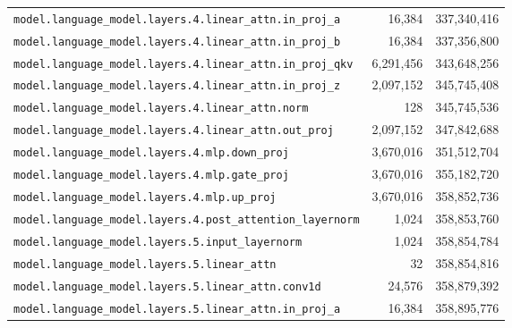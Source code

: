 \documentclass[10pt,a4paper]{article}
\theoremstyle{definition}
\begin{document}
\begin{appendices}
\begin{longtable}{p{9.5cm}rr}
\texttt{model.\allowbreak{}language\_model.\allowbreak{}layers.\allowbreak{}4.\allowbreak{}linear\_attn.\allowbreak{}in\_proj\_a} & 16,384 & 337,340,416 \\
\texttt{model.\allowbreak{}language\_model.\allowbreak{}layers.\allowbreak{}4.\allowbreak{}linear\_attn.\allowbreak{}in\_proj\_b} & 16,384 & 337,356,800 \\
\texttt{model.\allowbreak{}language\_model.\allowbreak{}layers.\allowbreak{}4.\allowbreak{}linear\_attn.\allowbreak{}in\_proj\_qkv} & 6,291,456 & 343,648,256 \\
\texttt{model.\allowbreak{}language\_model.\allowbreak{}layers.\allowbreak{}4.\allowbreak{}linear\_attn.\allowbreak{}in\_proj\_z} & 2,097,152 & 345,745,408 \\
\texttt{model.\allowbreak{}language\_model.\allowbreak{}layers.\allowbreak{}4.\allowbreak{}linear\_attn.\allowbreak{}norm} & 128 & 345,745,536 \\
\texttt{model.\allowbreak{}language\_model.\allowbreak{}layers.\allowbreak{}4.\allowbreak{}linear\_attn.\allowbreak{}out\_proj} & 2,097,152 & 347,842,688 \\
\texttt{model.\allowbreak{}language\_model.\allowbreak{}layers.\allowbreak{}4.\allowbreak{}mlp.\allowbreak{}down\_proj} & 3,670,016 & 351,512,704 \\
\texttt{model.\allowbreak{}language\_model.\allowbreak{}layers.\allowbreak{}4.\allowbreak{}mlp.\allowbreak{}gate\_proj} & 3,670,016 & 355,182,720 \\
\texttt{model.\allowbreak{}language\_model.\allowbreak{}layers.\allowbreak{}4.\allowbreak{}mlp.\allowbreak{}up\_proj} & 3,670,016 & 358,852,736 \\
\texttt{model.\allowbreak{}language\_model.\allowbreak{}layers.\allowbreak{}4.\allowbreak{}post\_attention\_layernorm} & 1,024 & 358,853,760 \\
\texttt{model.\allowbreak{}language\_model.\allowbreak{}layers.\allowbreak{}5.\allowbreak{}input\_layernorm} & 1,024 & 358,854,784 \\
\texttt{model.\allowbreak{}language\_model.\allowbreak{}layers.\allowbreak{}5.\allowbreak{}linear\_attn} & 32 & 358,854,816 \\
\texttt{model.\allowbreak{}language\_model.\allowbreak{}layers.\allowbreak{}5.\allowbreak{}linear\_attn.\allowbreak{}conv1d} & 24,576 & 358,879,392 \\
\texttt{model.\allowbreak{}language\_model.\allowbreak{}layers.\allowbreak{}5.\allowbreak{}linear\_attn.\allowbreak{}in\_proj\_a} & 16,384 & 358,895,776 \\

\end{longtable}
\end{appendices}
\end{document}
